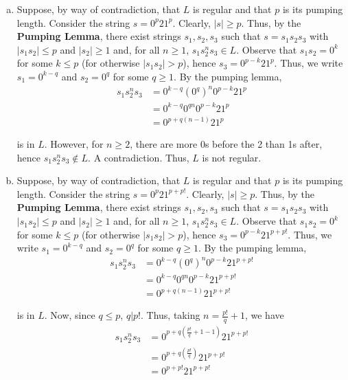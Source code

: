 \begin{solution}\mbox{\\}
\begin{enumerate}[(a)]
    \item Suppose, by way of contradiction, that $L$ is regular and that $p$ is its pumping length. Consider the string $s=0^p21^p$. Clearly, $|s|\geq p$. Thus, by the \textbf{Pumping Lemma}, there exist strings $s_1, s_2, s_3$ such that $s=s_1s_2s_3$ with $|s_1s_2|\leq p$ and $|s_2|\geq1$ and, for all $n\geq 1$, $s_1s_2^ns_3\in L$. Observe that $s_1s_2=0^k$ for some $k\leq p$ (for otherwise $|s_1s_2| > p$), hence $s_3=0^{p-k}21^p$. Thus, we write $s_1=0^{k-q}$ and $s_2=0^{q}$ for some $q\geq1$. By the pumping lemma, 
    \begin{align*}
        s_1s_2^ns_3 &= 0^{k-q}(0^q)^n0^{p-k}21^p\\
                    &= 0^{k-q}0^{qn}0^{p-k}21^p\\
                    &= 0^{p+q(n-1)}21^p
    \end{align*}

    is in $L$. However, for $n\geq2$, there are more 0s before the 2 than 1s after, hence $s_1s_2^ns_3\not\in L$. A contradiction. Thus, $L$ is not regular.

    \item Suppose, by way of contradiction, that $L$ is regular and that $p$ is its pumping length. Consider the string $s=0^p21^{p+p!}$. Clearly, $|s|\geq p$. Thus, by the \textbf{Pumping Lemma}, there exist strings $s_1, s_2, s_3$ such that $s=s_1s_2s_3$ with $|s_1s_2|\leq p$ and $|s_2|\geq1$ and, for all $n\geq 1$, $s_1s_2^ns_3\in L$. Observe that $s_1s_2=0^k$ for some $k\leq p$ (for otherwise $|s_1s_2| > p$), hence $s_3=0^{p-k}21^{p+p!}$. Thus, we write $s_1=0^{k-q}$ and $s_2=0^{q}$ for some $q\geq1$. By the pumping lemma, 
    \begin{align*}
        s_1s_2^ns_3 &= 0^{k-q}(0^q)^n0^{p-k}21^{p+p!}\\
                    &= 0^{k-q}0^{qn}0^{p-k}21^{p+p!}\\
                    &= 0^{p+q(n-1)}21^{p+p!}
    \end{align*}

    is in $L$. Now, since $q\leq p$, $q|p!$. Thus, taking $n=\frac{p!}{q}+1$, we have 
    \begin{align*}
        s_1s_2^ns_3 &= 0^{p+q(\frac{p!}{q}+1-1)}21^{p+p!}\\
                    &= 0^{p+q(\frac{p!}{q})}21^{p+p!}\\
                    &= 0^{p+p!}21^{p+p!}
    \end{align*}
    

\end{enumerate}
\end{solution}
